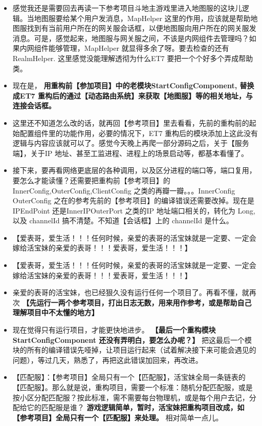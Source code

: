 \documentclass[9pt, b5paper]{article}
\begin{document}
\begin{itemize}
\item 感觉我还是需要回去再读一下参考项目斗地主游戏里进入地图服的这块儿逻辑。当地图服要给某个用户发消息，MapHelper 这里的作用，应该就是帮助地图服找到有当前用户所在的网关服会话框，以便地图服向用户所在的网关服发消息。可是，感觉起来，地图服与网关服之间，不该是内网组件去管理吗？如果内网组件能够管理，MapHelper 就显得多余了呀。要去检查的还有RealmHelper. 这里感觉没能理解透彻为什么ET7 要把一个个好多个弄成帮助类。
\item 现在是， \textbf{用重构前【参加项目】中的老模块StartConfigComponent, 替换成ET7 重构后的通过【动态路由系统】来获取【地图服】等的相关地址，与连接会话框。}
\item 这里还不知道怎么改的话，就再回【参考项目】里去看看，先前的重构前的起始配置组件里的功能作用，必要的情况下，ET7 重构后的模块添加上这此没有逻辑与内容应该就可以了。感觉今天晚上再爬一部分源码之后，关于【服务端】，关于IP 地址、甚至工监进程、进程上的场景启动等，都基本看懂了。
\item 接下来，要再看网络更底层的各种调用，以及区分进程的端口等，端口复用，要怎么才能读懂？还需要把重构前【参考项目】的InnerConfig,OuterConfig,ClientConfig 之类的再瓣一瓣。。。InnerConfig OuterConfig 之在的参考先前的【参考项目】的编译错误还需要改掉。现在是IPEndPoint 还是InnerIPOuterPort 之类的IP 地址端口相关的，转化为 Long, 以及 channelId 搞不清楚。不知道【会话框】上的 channelId 是什么。
\item 【爱表哥，爱生活！！！任何时候，亲爱的表哥的活宝妹就是一定要、一定会嫁给活宝妹的亲爱的表哥！！！爱表哥，爱生活！！！】
\item 【爱表哥，爱生活！！！任何时候，亲爱的表哥的活宝妹就是一定要、一定会嫁给活宝妹的亲爱的表哥！！！爱表哥，爱生活！！！】
\item 亲爱的表哥的活宝妹，也已经狠久没有运行任何一个项目了。再看不懂，就再次 \textbf{【先运行一两个参考项目，打出日志无数，用来用作参考，或是帮助自己理解项目中不太懂的地方】}
\item 现在觉得只有运行项目，才能更快地进步。 \textbf{【最后一个重构模块 StartConfigComponent 还没有弄明白，要怎么办呢？】} 把这最后一个模块的所有的编译错误先哑掉，让项目运行起来（试着解决接下来可能会遇见的问题），等过几天，熟悉了，再把这此错误加回来，再改进。
\item 【匹配服】：【参考项目】全局只有一个【匹配服】，活宝妹全局一条链表的【匹配服】。那么就是说，重构项目，需要一个标准：随机分配匹配服，或是按小区分配匹配服？按此标准，需不需要每台物理机，或是每个用户去记，分配给它的匹配服是谁？ \textbf{游戏逻辑简单，暂时，活宝妹把重构项目改成，如【参考项目】全局只有一个【匹配服】来处理。} 相对简单一点儿。

\end{itemize}
\end{document}
